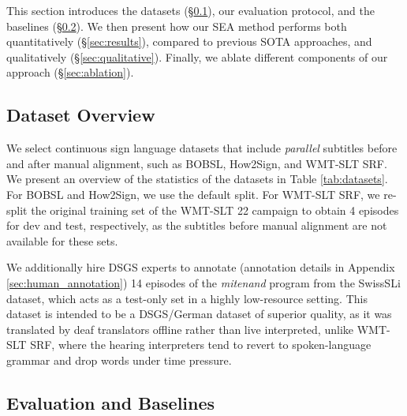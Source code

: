 \documentclass[11pt]{article}
\newcommand{\az}[1]{{\color{blue}[az: #1]}} %
\begin{document}
This section introduces the datasets (\S\ref{sec:datasets}), our evaluation protocol, and the baselines (\S\ref{sec:baseline}). 
We then present how our SEA method performs both quantitatively (\S\ref{sec:results}), compared to previous SOTA approaches, and qualitatively (\S\ref{sec:qualitative}).
Finally, we ablate different components of our approach (\S\ref{sec:ablation}).

\subsection{Dataset Overview}
\label{sec:datasets}

We select continuous sign language datasets that include \textit{parallel} subtitles before and after manual alignment, such as BOBSL, How2Sign, and WMT-SLT SRF. We present an overview of the statistics of the datasets in Table \ref{tab:datasets}.
For BOBSL and How2Sign, we use the default split.
For WMT-SLT SRF, we re-split the original training set of the WMT-SLT 22 campaign to obtain 4 episodes for dev and test, respectively, as the subtitles before manual alignment are not available for these sets.

We additionally hire DSGS experts to annotate (annotation details in Appendix \ref{sec:human_annotation}) 14 episodes of the \textit{mitenand} program from the SwissSLi dataset, which acts as a test-only set in a highly low-resource setting.
This dataset is intended to be a DSGS/German dataset of superior quality, as it was translated by deaf translators offline rather than live interpreted, unlike WMT-SLT SRF, where the hearing interpreters tend to revert to spoken-language grammar and drop words under time pressure.

\subsection{Evaluation and Baselines}
\label{sec:baseline}
\end{document}
